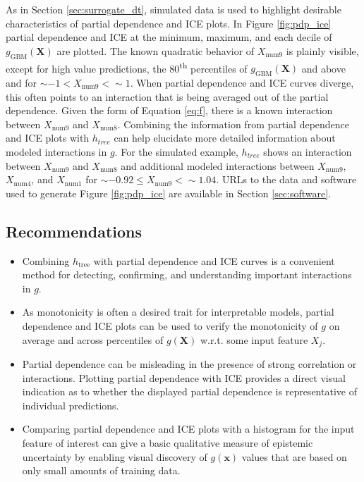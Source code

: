\documentclass[sigconf, review]{acmart}
\begin{document}
As in Section \ref{sec:surrogate_dt}, simulated data is used to highlight desirable characteristics of partial dependence and ICE plots. In Figure \ref{fig:pdp_ice} partial dependence and ICE at the minimum, maximum, and each decile of $g_{\text{GBM}}(\mathbf{X})$ are plotted. The known quadratic behavior of $X_{\text{num}9}$ is plainly visible, except for high value predictions, the 80\textsuperscript{th} percentiles of $g_{\text{GBM}}(\mathbf{X})$ and above and for $\sim-1 < X_{\text{num}9} < \sim1$. When partial dependence and ICE curves diverge, this often points to an interaction that is being averaged out of the partial dependence. Given the form of Equation \ref{eq:f}, there is a known interaction between $X_{\text{num}9}$ and $X_{\text{num}8}$. Combining the information from partial dependence and ICE plots with $h_{tree}$ can help elucidate more detailed information about modeled interactions in $g$. For the simulated example, $h_{tree}$ shows an interaction between $X_{\text{num}9}$ and $X_{\text{num}8}$ and additional modeled interactions between $X_{\text{num}9}$, $X_{\text{num}4}$, and $X_{\text{num}1}$ for $\sim -0.92 \le X_{\text{num}9} <  \sim 1.04.$ URLs to the data and software used to generate Figure \ref{fig:pdp_ice} are available in Section \ref{sec:software}.

\subsection{Recommendations}

\begin{itemize}

\item Combining $h_{\text{tree}}$ with partial dependence and ICE curves is a convenient method for detecting, confirming, and understanding important interactions in $g$.

\item As monotonicity is often a desired trait for interpretable models, partial dependence and ICE plots can be used to verify the monotonicity of $g$ on average and across percentiles of $g(\mathbf{X})$ w.r.t. some input feature $X_j$.

\item Partial dependence can be misleading in the presence of strong correlation or interactions. Plotting partial dependence with ICE provides a direct visual indication as to whether the displayed partial dependence is representative of individual predictions.

\item Comparing partial dependence and ICE plots with a histogram for the input feature of interest can give a basic qualitative measure of epistemic uncertainty by enabling visual discovery of $g(\mathbf{x})$ values that are based on only small amounts of training data.

\end{itemize}
\end{document}
